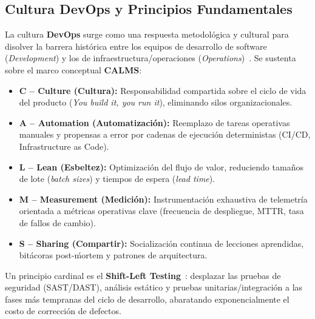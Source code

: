 \documentclass[11pt,a4paper]{article}
\begin{document}
\subsection{Cultura DevOps y Principios Fundamentales}
La cultura \textbf{DevOps} surge como una respuesta metodol\'ogica y cultural para disolver la barrera hist\'orica entre los equipos de desarrollo de software (\emph{Development}) y los de infraestructura/operaciones (\emph{Operations})~\cite{kim2021devops}. Se sustenta sobre el marco conceptual \textbf{CALMS}:
\begin{itemize}[noitemsep]
  \item \textbf{C -- Culture (Cultura):} Responsabilidad compartida sobre el ciclo de vida del producto (\emph{You build it, you run it}), eliminando silos organizacionales.
  \item \textbf{A -- Automation (Automatizaci\'on):} Reemplazo de tareas operativas manuales y propensas a error por cadenas de ejecuci\'on deterministas (CI/CD, Infrastructure as Code).
  \item \textbf{L -- Lean (Esbeltez):} Optimizaci\'on del flujo de valor, reduciendo tama\~nos de lote (\emph{batch sizes}) y tiempos de espera (\emph{lead time}).
  \item \textbf{M -- Measurement (Medici\'on):} Instrumentaci\'on exhaustiva de telemetr\'ia orientada a m\'etricas operativas clave (frecuencia de despliegue, MTTR, tasa de fallos de cambio).
  \item \textbf{S -- Sharing (Compartir):} Socializaci\'on continua de lecciones aprendidas, bit\'acoras post-\'mortem y patrones de arquitectura.
\end{itemize}

Un principio cardinal es el \textbf{Shift-Left Testing}~\cite{winters2020software}: desplazar las pruebas de seguridad (SAST/DAST), an\'alisis est\'atico y pruebas unitarias/integraci\'on a las fases m\'as tempranas del ciclo de desarrollo, abaratando exponencialmente el costo de correcci\'on de defectos.
\end{document}
